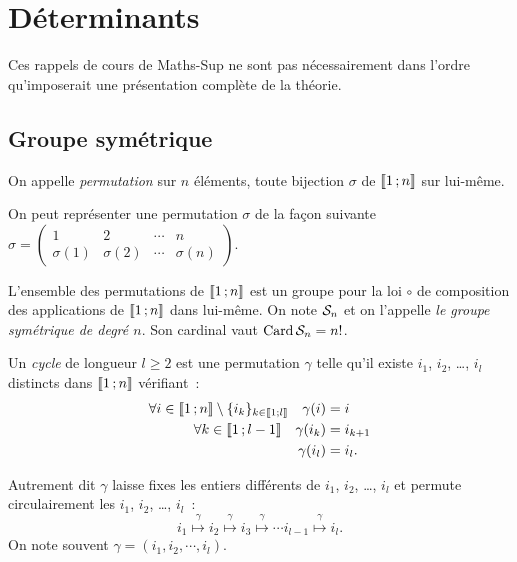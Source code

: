 \chapter{Déterminants}
\minitoc
\minilof
\minilot

\begin{remarque}
	Ces rappels de cours de Maths-Sup ne sont pas nécessairement dans l'ordre qu'imposerait une présentation complète de la théorie. 
\end{remarque}
\section{Groupe symétrique}
\begin{defdef}[permutation]
	On appelle \emph{permutation} sur $n$ éléments, toute bijection $\sigma$ de $\intervalleentier{1}{n}$ sur lui-même. 
\end{defdef}

On peut représenter une permutation $\sigma$ de la façon suivante $\sigma = 
\begin{pmatrix}
	1 & 2 & \cdots & n \\
	\sigma(1)& \sigma(2)  &\cdots  & \sigma(n) 
\end{pmatrix}
$.

L'ensemble des permutations de $\intervalleentier{1}{n}$ est un groupe pour la loi $\circ$ de composition des applications de $\intervalleentier{1}{n}$ dans lui-même. On note $\S_n$ et on l'appelle \emph{le groupe symétrique de degré $n$}. Son cardinal vaut $\Card \S_n = n!$.

\begin{defdef}[Cycle]
	Un \emph{cycle} de longueur $l \geqslant 2$ est une permutation $\gamma$ telle qu'il existe $i_1$, $i_2$, \ldots, $i_l$ distincts dans $\intervalleentier{1}{n}$ vérifiant~:
	\begin{align}
		\forall i \in \intervalleentier{1}{n} \setminus \{i_k\}_{k \in \intervalleentier{1}{l}} \quad \gamma(i)&=i \\
		\forall k \in \intervalleentier{1}{l-1} \quad \gamma(i_k) &= i_{k+1} \\
		\gamma(i_l) &= i_l.
	\end{align}
\end{defdef}
Autrement dit $\gamma$ laisse fixes les entiers différents de $i_1$, $i_2$, \ldots, $i_l$ et permute circulairement les $i_1$, $i_2$, \ldots, $i_l$~:
\begin{equation}
	i_1 \overset{\gamma}{\longmapsto} i_2 \overset{\gamma}{\longmapsto} i_3 \overset{\gamma}{\longmapsto} \cdots i_{l-1} \overset{\gamma}{\longmapsto} i_l.
\end{equation}
On note souvent $\gamma = (i_1, i_2, \cdots, i_l)$.

